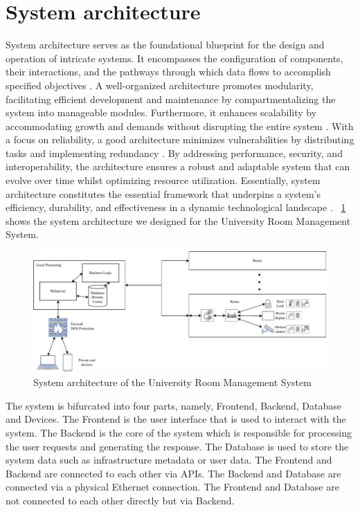 \documentclass[conference,onecolumn]{IEEEtran}
\begin{document}
\section{System architecture}
	System architecture serves as the foundational blueprint for the design and operation of intricate systems. It encompasses the configuration of components, their interactions, and the pathways through which data flows to accomplish specified objectives \cite{steen2007distributed}. A well-organized architecture promotes modularity, facilitating efficient development and maintenance by compartmentalizing the system into manageable modules. Furthermore, it enhances scalability by accommodating growth and demands without disrupting the entire system \cite{kotseruba2016review}. With a focus on reliability, a good architecture minimizes vulnerabilities by distributing tasks and implementing redundancy \cite{steen2007distributed}. By addressing performance, security, and interoperability, the architecture ensures a robust and adaptable system that can evolve over time whilst optimizing resource utilization. Essentially, system architecture constitutes the essential framework that underpins a system's efficiency, durability, and effectiveness in a dynamic technological landscape \cite{kotseruba2016review}. \figurename~\ref{fig:systemarchitecture} shows the system architecture we designed for the University Room Management System.


	\begin{figure}[H]
		\centering
		\includegraphics[width=1\textwidth]{Figures/SystemArchitecture.pdf}
		\caption{System architecture of the University Room Management System}
		\label{fig:systemarchitecture}
	\end{figure}

	The system is bifurcated into four parts, namely, Frontend, Backend, Database and Devices. The Frontend is the user interface that is used to interact with the system. The Backend is the core of the system which is responsible for processing the user requests and generating the response. The Database is used to store the system data such as infrastructure metadata or user data. The Frontend and Backend are connected to each other via APIs. The Backend and Database are connected via a physical Ethernet connection. The Frontend and Database are not connected to each other directly but via Backend. 
\end{document}
